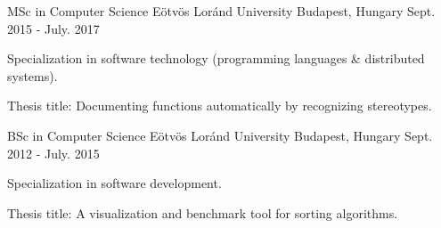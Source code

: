 

\begin{cventries}

  \cventry
    {MSc in Computer Science} %
    {Eötvös Loránd University} %
    {Budapest, Hungary} %
    {Sept. 2015 - July. 2017} %
    {
      \begin{cvitems} %
        \item {Specialization in software technology (programming languages \& distributed systems).}
		\item {Thesis title: Documenting functions automatically by recognizing stereotypes.}
      \end{cvitems}
    }
  \cventry
    {BSc in Computer Science} %
    {Eötvös Loránd University} %
    {Budapest, Hungary} %
    {Sept. 2012 - July. 2015} %
    {
      \begin{cvitems} %
        \item {Specialization in software development.}
		\item {Thesis title: A visualization and benchmark tool for sorting algorithms.}
      \end{cvitems}
    }

\end{cventries}
